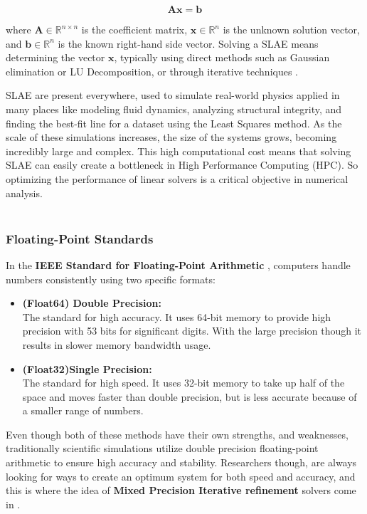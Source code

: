 \documentclass[a4paper,10.5pt,twoside]{article}
\begin{document}
    \[
    \mathbf{A}\mathbf{x} = \mathbf{b}
    \]

    where $\mathbf{A} \in \mathbb{R}^{n \times n}$ is the coefficient matrix, $\mathbf{x} \in \mathbb{R}^{n}$ is the unknown solution vector, and $\mathbf{b} \in \mathbb{R}^{n}$ is the known right-hand side vector. Solving a SLAE means determining the vector $\mathbf{x}$, typically using direct methods such as Gaussian elimination or LU Decomposition, or through iterative techniques \autocite{elman2014finite}.

    SLAE are present everywhere, used to simulate real-world physics applied in many places like modeling fluid dynamics, analyzing structural integrity, and finding the best-fit line for a dataset using the Least Squares method. As the scale of these simulations increases, the size of the systems grows, becoming incredibly large and complex. This high computational cost means that solving SLAE can easily create a bottleneck in High Performance Computing (HPC). So optimizing the performance of linear solvers is a critical objective in numerical analysis.
    \\\\

\subsubsection*{Floating-Point Standards}    
In the \textbf{IEEE Standard for Floating-Point Arithmetic} \autocite{IEEE754_2019}, computers handle numbers consistently using two specific formats:
    \begin{itemize}
    \item \textbf{(Float64) Double Precision:}\\
        The standard for high accuracy. It uses 64-bit memory to  provide high precision with 53 bits for significant digits. With the large precision though it results in slower memory bandwidth usage.
            
    \item \textbf{(Float32)Single Precision:}\\
        The standard for high speed. It uses 32-bit memory to take up half of the space and moves faster than double precision, but is less accurate because of a smaller range of numbers. 
    
    \end{itemize}
    Even though both of these methods have their own strengths, and weaknesses, traditionally scientific simulations utilize double precision floating-point arithmetic to ensure high accuracy and stability. Researchers though, are always looking for ways to create an optimum system for both speed and accuracy, and this is where the idea of \textbf{Mixed Precision Iterative refinement} solvers come in \autocite{Higham_Mary_2022}.
        
\end{document}

